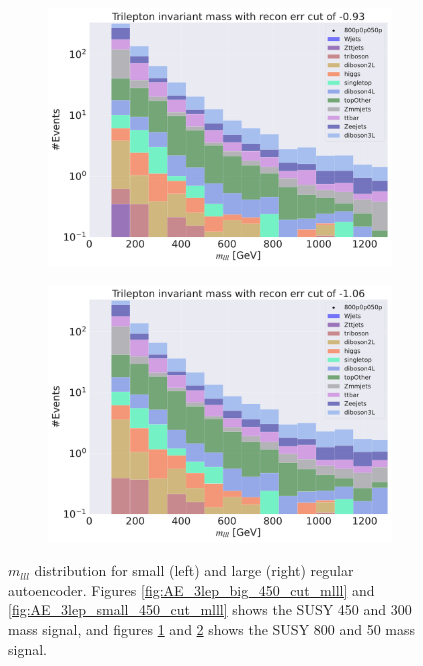 \begin{figure}[H]
    \hfill
    \begin{subfigure}{.45\textwidth}
        \includegraphics[width=\textwidth]{Figures/AE_testing/big/3lep/b_data_recon_big_rm3_feats_sig_800p0p050p_mlll_recon_errcut_-0.93.pdf}
        \caption{}
        \label{fig:AE_3lep_big_800_cut_mlll}
    \end{subfigure}
    \hfill   
    \begin{subfigure}{.45\textwidth}
        \includegraphics[width=\textwidth]{Figures/AE_testing/small/3lep/b_data_recon_big_rm3_feats_sig_800p0p050p_mlll_recon_errcut_-1.06.pdf}
        \caption{}
        \label{fig:AE_3lep_small_800_cut_mlll}
    \end{subfigure}
    \hfill      
    \caption[Some $m_{lll}$ cuts for AE]{$m_{lll}$ distribution for small (left) and large (right) regular autoencoder.
    Figures \ref{fig:AE_3lep_big_450_cut_mlll} and \ref{fig:AE_3lep_small_450_cut_mlll} shows the SUSY 450 and 300 mass signal, 
    and figures \ref{fig:AE_3lep_big_800_cut_mlll} and \ref{fig:AE_3lep_small_800_cut_mlll} shows the SUSY 800 and 50 mass signal.}
    \label{fig:AE_3lep_recon_err_both_sig_cut_mlll}
\end{figure}

